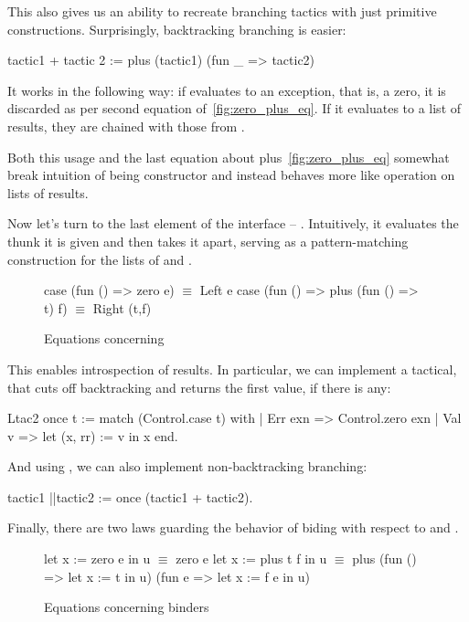This also gives us an ability to recreate branching tactics with just primitive constructions.
Surprisingly, backtracking branching is easier:
\begin{coq}
tactic1 + tactic 2 := plus (tactic1) (fun _ => tactic2)
\end{coq}
It works in the following way: if  evaluates to an exception, that is, a zero, it is discarded as per second equation of~\ref{fig:zero_plus_eq}.
If it evaluates to a list of results, they are chained with those from .

Both this usage and the last equation about plus~\ref{fig:zero_plus_eq} somewhat break intuition of  being  constructor and instead behaves more like  operation on lists of results.

Now let's turn to the last element of the interface -- .
Intuitively, it evaluates the thunk it is given and then takes it apart, serving as a pattern-matching construction for the lists of  and .
\begin{figure}[H]
\begin{coq}
case (fun () => zero e) $\equiv$ Left e
case (fun () => plus (fun () => t) f) $\equiv$ Right (t,f)
\end{coq}
\caption{Equations concerning }
\label{fig:case_eq}
\end{figure}

This enables introspection of results.
In particular, we can implement a tactical, that cuts off backtracking and returns the first value, if there is any:
\begin{coq}
Ltac2 once t := match (Control.case t) with
  | Err exn => Control.zero exn
  | Val v => let (x, rr) := v in x
  end.
\end{coq}

And using , we can also implement non-backtracking branching:
\begin{coq}
tactic1 ||tactic2 := once (tactic1 + tactic2).
\end{coq}

Finally, there are two laws guarding the behavior of biding with respect to  and .
\begin{figure}[H]
\begin{coq}
let x := zero e in u $\equiv$ zero e
let x := plus t f in u $\equiv$ plus (fun () => let x := t in u) (fun e => let x := f e in u)
\end{coq}
\caption{Equations concerning binders}
\label{fig:let_eq}
\end{figure}

